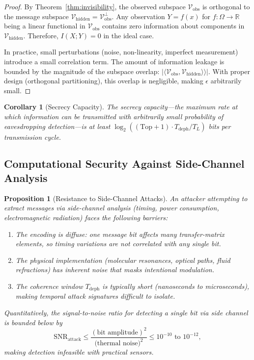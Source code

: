 \documentclass[11pt,twocolumn,a4paper]{article}
\newtheorem{proposition}[theorem]{Proposition}
\newtheorem{corollary}[theorem]{Corollary}
\theoremstyle{definition}
\newcommand{\Real}{\mathbb{R}}
\newcommand{\abs}[1]{\left|#1\right|}
\begin{document}
\begin{proof}
By Theorem~\ref{thm:invisibility}, the observed subspace $\mathcal{V}_{\text{obs}}$ is orthogonal to the message subspace $\mathcal{V}_{\text{hidden}} = \mathcal{V}_{\text{obs}}^\perp$. Any observation $Y = f(x)$ for $f : \Omega \to \Real$ being a linear functional in $\mathcal{V}_{\text{obs}}$ contains zero information about components in $\mathcal{V}_{\text{hidden}}$. Therefore, $I(X; Y) = 0$ in the ideal case.

In practice, small perturbations (noise, non-linearity, imperfect measurement) introduce a small correlation term. The amount of information leakage is bounded by the magnitude of the subspace overlap: $\abs{\langle \mathcal{V}_{\text{obs}}, \mathcal{V}_{\text{hidden}} \rangle \rangle}$. With proper design (orthogonal partitioning), this overlap is negligible, making $\epsilon$ arbitrarily small.
\end{proof}

\begin{corollary}[Secrecy Capacity]
\label{cor:secrecy-capacity}
The secrecy capacity—the maximum rate at which information can be transmitted with arbitrarily small probability of eavesdropping detection—is at least $\log_2((\text{Top}+1) \cdot T_{\text{deph}}/T_L)$ bits per transmission cycle.
\end{corollary}

\subsection{Computational Security Against Side-Channel Analysis}

\begin{proposition}[Resistance to Side-Channel Attacks]
\label{prop:side-channel}
An attacker attempting to extract messages via side-channel analysis (timing, power consumption, electromagnetic radiation) faces the following barriers:

\begin{enumerate}[nosep]
\item The encoding is diffuse: one message bit affects many transfer-matrix elements, so timing variations are not correlated with any single bit.
\item The physical implementation (molecular resonances, optical paths, fluid refractions) has inherent noise that masks intentional modulation.
\item The coherence window $T_{\text{deph}}$ is typically short (nanoseconds to microseconds), making temporal attack signatures difficult to isolate.
\end{enumerate}

Quantitatively, the signal-to-noise ratio for detecting a single bit via side channel is bounded below by
\[
\text{SNR}_{\text{attack}} \leq \frac{(\text{bit amplitude})^2}{\text{(thermal noise)}^2} \leq 10^{-10} \text{ to } 10^{-12},
\]
making detection infeasible with practical sensors.
\end{proposition}
\end{document}
